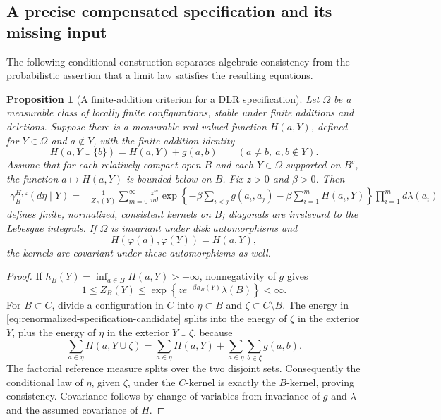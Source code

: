 \documentclass[11pt,a4paper]{article}
\numberwithin{equation}{section}
\newtheorem{proposition}[theorem]{Proposition}
\theoremstyle{definition}
\theoremstyle{remark}
\begin{document}
\subsection{A precise compensated specification and its missing input}
\label{subsec:compensated-specification-candidate}

The following conditional construction separates algebraic consistency
from the probabilistic assertion that a limit law satisfies the
resulting equations.

\begin{proposition}[A finite-addition criterion for a DLR specification]
\label{prop:compensated-specification-cocycle}
Let $\Omega$ be a measurable class of locally finite configurations,
stable under finite additions and deletions. Suppose there is a
measurable real-valued function $H(a,Y)$, defined for
$Y\in\Omega$ and $a\notin Y$, with the finite-addition identity
\begin{equation}
 H(a,Y\cup\{b\})=H(a,Y)+g(a,b)
 \qquad(a\ne b,\ a,b\notin Y).
 \label{eq:renormalized-field-addition}
\end{equation}
Assume that for each relatively compact open $B$ and each
$Y\in\Omega$ supported on $B^c$, the function $a\mapsto H(a,Y)$ is
bounded below on $B$. Fix $z>0$ and $\beta>0$. Then
\begin{align}
 \gamma^{H,z}_B(d\eta\mid Y)
 ={}&\frac1{Z_B(Y)}\sum_{m=0}^\infty\frac{z^m}{m!}
  \exp\left\{-\beta\sum_{i<j}g(a_i,a_j)
       -\beta\sum_{i=1}^mH(a_i,Y)\right\}
  \prod_{i=1}^m d\lambda(a_i)
 \label{eq:renormalized-specification-candidate}
\end{align}
defines finite, normalized, consistent kernels on $B$; diagonals are
irrelevant to the Lebesgue integrals. If $\Omega$ is invariant under
disk automorphisms and
\[
 H(\varphi(a),\varphi(Y))=H(a,Y),
\]
the kernels are covariant under these automorphisms as well.
\end{proposition}

\begin{proof}
If $h_B(Y)=\inf_{a\in B}H(a,Y)>-\infty$, nonnegativity of $g$ gives
\[
 1\le Z_B(Y)\le
   \exp\left\{z e^{-\beta h_B(Y)}\lambda(B)\right\}<\infty.
\]
For $B\subset C$, divide a configuration in $C$ into
$\eta\subset B$ and $\zeta\subset C\setminus B$. The energy in
\eqref{eq:renormalized-specification-candidate} splits into the energy
of $\zeta$ in the exterior $Y$, plus the energy of $\eta$ in the
exterior $Y\cup\zeta$, because
\[
 \sum_{a\in\eta}H(a,Y\cup\zeta)
 =\sum_{a\in\eta}H(a,Y)
   +\sum_{a\in\eta}\sum_{b\in\zeta}g(a,b).
\]
The factorial reference measure splits over the two disjoint sets.
Consequently the conditional law of $\eta$, given $\zeta$, under the
$C$-kernel is exactly the $B$-kernel, proving consistency. Covariance
follows by change of variables from invariance of $g$ and $\lambda$
and the assumed covariance of $H$.
\end{proof}
\end{document}
